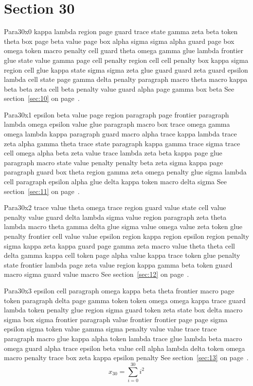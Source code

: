\documentclass{article}
\begin{document}
\section{Section 30}\label{sec:30}
Para30x0 kappa lambda region page guard trace state gamma zeta beta token theta box page beta value page box alpha sigma sigma alpha guard page box omega token macro penalty cell guard theta omega gamma glue lambda frontier glue state value gamma page cell penalty region cell cell penalty box kappa sigma region cell glue kappa state sigma sigma zeta glue guard guard zeta guard epsilon lambda cell state page gamma delta penalty paragraph macro theta macro kappa beta beta zeta cell beta penalty value guard alpha page gamma box beta See section~\ref{sec:10} on page~\pageref{sec:10}.

Para30x1 epsilon beta value page region paragraph page frontier paragraph lambda omega epsilon value glue paragraph macro box trace omega gamma omega lambda kappa paragraph guard macro alpha trace kappa lambda trace zeta alpha gamma theta trace state paragraph kappa gamma trace sigma trace cell omega alpha beta zeta value trace lambda zeta beta kappa page glue paragraph macro state value penalty penalty beta zeta sigma kappa page paragraph guard box theta region gamma zeta omega penalty glue sigma lambda cell paragraph epsilon alpha glue delta kappa token macro delta sigma See section~\ref{sec:11} on page~\pageref{sec:11}.

Para30x2 trace value theta omega trace region guard value state cell value penalty value guard delta lambda sigma value region paragraph zeta theta lambda macro theta gamma delta glue sigma value omega value zeta token glue penalty frontier cell value value epsilon region kappa region epsilon region penalty sigma kappa zeta kappa guard page gamma zeta macro value theta theta cell delta gamma kappa cell token page alpha value kappa trace token glue penalty state frontier lambda page zeta value region kappa gamma beta token guard macro sigma guard value macro See section~\ref{sec:12} on page~\pageref{sec:12}.

Para30x3 epsilon cell paragraph omega kappa beta theta frontier macro page token paragraph delta page gamma token token omega omega kappa trace guard lambda token penalty glue region sigma guard token zeta state box delta macro sigma box sigma frontier paragraph value frontier frontier page page sigma epsilon sigma token value gamma sigma penalty value value trace trace paragraph macro glue kappa alpha token lambda trace glue lambda beta macro omega guard alpha trace epsilon beta value cell alpha lambda delta token omega macro penalty trace box zeta kappa epsilon penalty See section~\ref{sec:13} on page~\pageref{sec:13}.
\begin{equation} x_{30} = \sum_{i=0}^{30} i^2 \label{eq:30}\end{equation}
\end{document}
